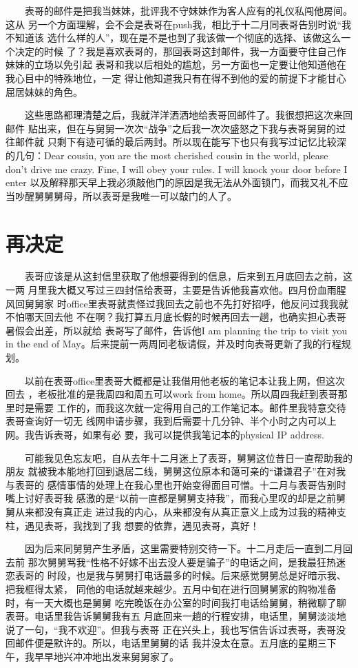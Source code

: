 \documentclass[12pt]{book}
\begin{document}
　　表哥的邮件是把我当妹妹，批评我不守妹妹作为客人应有的礼仪私闯他房间。这从
另一个方面理解，会不会是表哥在push我，相比于十二月同表哥告别时说“我不知道该
选什么样的人”，现在是不是也到了我该做一个彻底的选择、该做这么一个决定的时候
了？我是喜欢表哥的，那回表哥这封邮件，我一方面要守住自己作妹妹的立场以免引起
表哥和我以后相处的尴尬，另一方面也一定要让他知道他在我心目中的特殊地位，一定
得让他知道我只有在得不到他的爱的前提下才能甘心屈居妹妹的角色。

　　这些思路都理清楚之后，我就洋洋洒洒地给表哥回邮件了。我很想把这次来回邮件
贴出来，但在与舅舅一次次“战争”之后我一次次盛怒之下我与表哥舅舅的过往邮件就
只剩下有迹可循的最后两封。所以现在能写下也只有我写过记忆比较深的几句：Dear 
cousin, you are the most cherished cousin in the world, please don’t drive me crazy. Fine, I will obey your rules. I will knock your door before I enter 以及解释那天早上我必须敲他门的原因是我无法从外面锁门，而我又礼不应当吵醒舅舅舅母，所以表哥是我唯一可以敲门的人了。
\section{再决定}
\label{sec-8-13}

　　表哥应该是从这封信里获取了他想要得到的信息，后来到五月底回去之前，这一两
月里我大概又写过三四封信给表哥，主要是告诉他我喜欢他。四月份血雨腥风回舅舅家
时office里表哥就责怪过我回去之前也不先打好招呼，他反问过我我就不怕哪天回去他
不在啊？我打算五月底长假的时候再回去一趟，也确实担心表哥暑假会出差，所以就给
表哥写了邮件，告诉他I am planning the trip to visit you in the end of May。后来提前一两周同老板请假，并及时向表哥更新了我的行程规划。

　　以前在表哥office里表哥大概都是让我借用他老板的笔记本让我上网，但这次回去
，老板批准的是我周四和周五可以work from home。所以周四我赶到表哥那里时是需要
工作的，而我这次就一定得用自己的工作笔记本。邮件里我特意交待表哥查询好一切无
线网申请步骤，我到后需要十几分钟、半个小时之内可以上网。我告诉表哥，如果有必
要，我可以提供我笔记本的physical IP address.

　　可能我见色忘友吧，自从去年十二月迷上了表哥，舅舅这位昔日一直帮助我的朋友
就被我本能地打回到退居二线，舅舅这位原本和蔼可亲的“谦谦君子”在对我与表哥的
感情事情的处理上在我心里也开始变得面目可憎。十二月与表哥告别时嘴上讨好表哥我
感激的是“以前一直都是舅舅支持我”，而我心里叹的却是之前舅舅从来都没有真正走
进过我的内心，从来都没有从真正意义上成为过我的精神支柱，遇见表哥，我找到了我
想要的依靠，遇见表哥，真好！

　　因为后来同舅舅产生矛盾，这里需要特别交待一下。十二月走后一直到二月回去前
那次舅舅骂我“性格不好嫁不出去没人要是骗子”的电话之间，是我最狂热迷恋表哥的
时段，也是我与舅舅打电话最多的时候。后来感觉舅舅总是好暗示我、把我框得太紧，
同他的电话就越来越少。五月中旬在进行回舅舅家的购物准备时，有一天大概也是舅舅
吃完晚饭在办公室的时间我打电话给舅舅，稍微聊了聊表哥。电话里我告诉舅舅我有五
月底回来一趟的行程安排，电话里，舅舅淡淡地说了一句，“我不欢迎”。但我与表哥
正在兴头上，我也写信告诉过表哥，表哥没回邮件便是默许的。所以，电话里舅舅的话
我并没太在意。五月底的星期三下午，我早早地兴冲冲地出发来舅舅家了。
\end{document}
